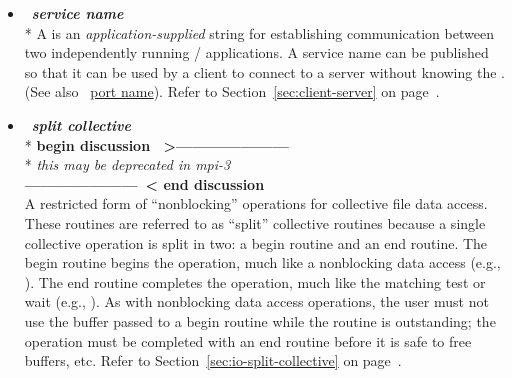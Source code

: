 \begin{itemize}
\label{glossary:service_name}
\item  ~\hypertarget{glossary:service_name}{\emph{\textbf{service name}}} \\*
A  is an {\em application-supplied} string for 
establishing communication between two independently running \MPI/ applications.
A service name can be published so that it
can be used by a client to connect to a server without knowing the  .
(See also ~\hyperlink{glossary:port_name}{port name}). 
Refer to Section~\ref{sec:client-server} on page~\pageref{sec:client-server}.

\label{glossary:split_collective}
\item  ~\hypertarget{glossary:split_collective}{\emph{\textbf{split collective}}} \\*
        \textbf{begin discussion ~\textgreater{}---------------------} \\*
        \emph{ this may be deprecated in mpi-3 } \\
        \textbf{---------------------~\textless{} end discussion}  \\
A restricted form of ``nonblocking'' operations
for collective file data access.
These routines are referred to as ``split'' collective routines
because a single collective operation is split in two:
a begin routine and an end routine.
The begin routine begins the operation,
much like a nonblocking data access (e.g., ).
The end routine completes the operation,
much like the matching test or wait (e.g., ).
As with nonblocking data access operations,
the user must not use the buffer
passed to a begin routine while the routine is outstanding;
the operation must be completed with an end routine before it
is safe to free buffers, etc.
Refer to Section~\ref{sec:io-split-collective} on page~\pageref{sec:io-split-collective}.


\end{itemize}
